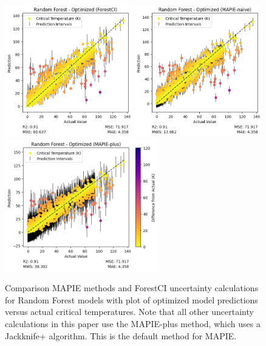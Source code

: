 \documentclass[twocolumn, nofootinbib, secnumarabic, amssymb, nobibnotes, aps, prd]{revtex4-2}
\begin{document}
\begin{figure}[!h]
   \centering
   \includegraphics[height=2.25in]{images/subfigures/random_forest_optimized_forestci.png} \nolinebreak
   \includegraphics[height=2.25in]{images/subfigures/random_forest_optimized_mapie-naive.png} \nolinebreak
   \includegraphics[height=2.25in]{images/subfigures/random_forest_optimized_mapie-plus.png}
   \caption{Comparison MAPIE methods and ForestCI uncertainty calculations for Random Forest models with plot of optimized model predictions versus actual critical temperatures. Note that all other uncertainty calculations in this paper use the MAPIE-plus method, which uses a Jackknife+ algorithm. This is the default method for MAPIE.}
   \label{fig:mapie-forestci}
\end{figure}%
\end{document}
